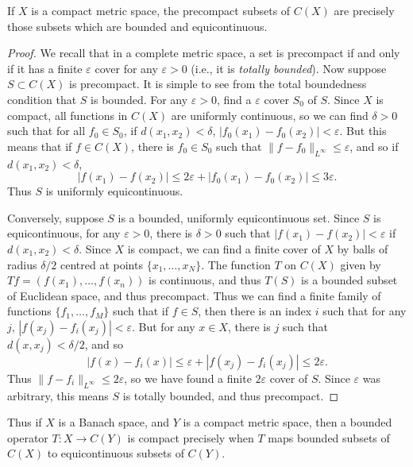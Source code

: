 \begin{theorem}
    If $X$ is a compact metric space, the precompact subsets of $C(X)$ are precisely those subsets which are bounded and equicontinuous.
\end{theorem}
\begin{proof}
    We recall that in a complete metric space, a set is precompact if and only if it has a finite $\varepsilon$ cover for any $\varepsilon > 0$ (i.e., it is \emph{totally bounded}). Now suppose $S \subset C(X)$ is precompact. It is simple to see from the total boundedness condition that $S$ is bounded. For any $\varepsilon > 0$, find a $\varepsilon$ cover $S_0$ of $S$. Since $X$ is compact, all functions in $C(X)$ are uniformly continuous, so we can find $\delta > 0$ such that for all $f_0 \in S_0$, if $d(x_1,x_2) < \delta$, $|f_0(x_1) - f_0(x_2)| < \varepsilon$. But this means that if $f \in C(X)$, there is $f_0 \in S_0$ such that $\| f - f_0 \|_{L^\infty} \leq \varepsilon$, and so if $d(x_1,x_2) < \delta$,
    \[ |f(x_1) - f(x_2)| \leq 2\varepsilon + |f_0(x_1) - f_0(x_2)| \leq 3\varepsilon. \]
    Thus $S$ is uniformly equicontinuous.

    Conversely, suppose $S$ is a bounded, uniformly equicontinuous set. Since $S$ is equicontinuous, for any $\varepsilon > 0$, there is $\delta > 0$ such that $|f(x_1) - f(x_2)| < \varepsilon$ if $d(x_1,x_2) < \delta$. Since $X$ is compact, we can find a finite cover of $X$ by balls of radius $\delta / 2$ centred at points $\{ x_1, \dots, x_N \}$. The function $T$ on $C(X)$ given by $Tf = (f(x_1), \dots, f(x_n))$ is continuous, and thus $T(S)$ is a bounded subset of Euclidean space, and thus precompact. Thus we can find a finite family of functions $\{ f_1, \dots, f_M \}$ such that if $f \in S$, then there is an index $i$ such that for any $j$, $|f(x_j) - f_i(x_j)| < \varepsilon$. But for any $x \in X$, there is $j$ such that $d(x,x_j) < \delta / 2$, and so
    \[ |f(x) - f_i(x)| \leq \varepsilon + |f(x_j) - f_i(x_j)| \leq 2\varepsilon. \]
    Thus $\| f - f_i \|_{L^\infty} \leq 2\varepsilon$, so we have found a finite $2 \varepsilon$ cover of $S$. Since $\varepsilon$ was arbitrary, this means $S$ is totally bounded, and thus precompact.
\end{proof}

Thus if $X$ is a Banach space, and $Y$ is a compact metric space, then a bounded operator $T: X \to C(Y)$ is compact precisely when $T$ maps bounded subsets of $C(X)$ to equicontinuous subsets of $C(Y)$.

